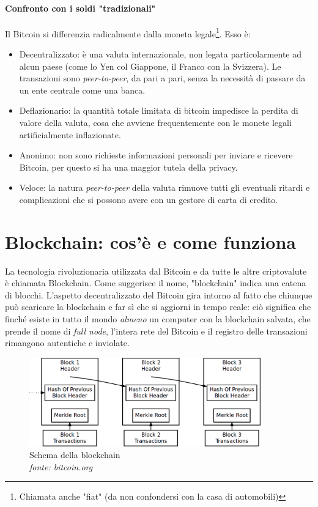 \documentclass {article}
\begin{document}
\paragraph {Confronto con i soldi "tradizionali"}

Il Bitcoin si differenzia radicalmente dalla moneta legale\footnote{Chiamata anche "fiat" (da non confondersi con la casa di automobili)}.
Esso è:

\begin{itemize}
\item Decentralizzato: è una valuta internazionale, non legata particolarmente ad alcun paese (come lo Yen col Giappone, il Franco con la Svizzera). Le transazioni sono \textit{peer-to-peer}, da pari a pari, senza la necessità di passare da un ente centrale come una banca.
\item Deflazionario: la quantità totale limitata di bitcoin impedisce la perdita di valore della valuta, cosa che avviene frequentemente con le monete legali artificialmente inflazionate.
\item Anonimo: non sono richieste informazioni personali per inviare e ricevere Bitcoin, per questo si ha una maggior tutela della privacy.
\item Veloce: la natura \textit{peer-to-peer} della valuta rimuove tutti gli eventuali ritardi e complicazioni che si possono avere con un gestore di carta di credito.
\end{itemize}


\newpage


\section {Blockchain: cos'è e come funziona}


La tecnologia rivoluzionaria utilizzata dal Bitcoin e da tutte le altre criptovalute è chiamata Blockchain.
Come suggerisce il nome, "blockchain" indica una catena di blocchi.
L'aspetto decentralizzato del Bitcoin gira intorno al fatto che chiunque può scaricare la blockchain e far sì che si aggiorni in tempo reale: ciò significa che finché esiste in tutto il mondo \emph{almeno} un computer con la blockchain salvata, che prende il nome di \textit{full node}, l'intera rete del Bitcoin e il registro delle transazioni rimangono autentiche e inviolate.

\vspace {0.5cm}
\begin{figure}[htb!]
\includegraphics [width = 10cm] {blockchain2.png}
\centering
\caption {Schema della blockchain\\\textit{fonte: bitcoin.org}}
\end{figure}
\end{document}
